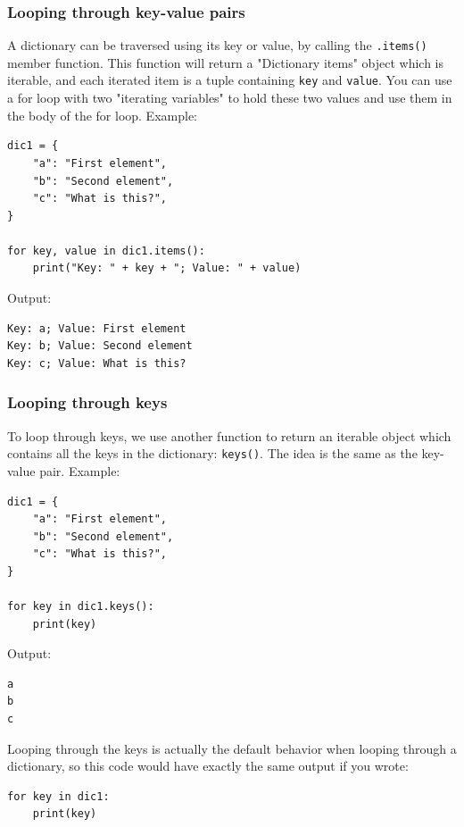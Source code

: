 \documentclass[12pt]{book}
\begin{document}
\subsubsection{Looping through key-value pairs}
\label{sec:org0eca189}
A dictionary can be traversed using its key or value, by calling the \texttt{.items()} member function. This function will return a "Dictionary items" object which is iterable, and each iterated item is a tuple containing \texttt{key} and \texttt{value}. You can use a for loop with two "iterating variables" to hold these two values and use them in the body of the for loop. Example:
\begin{verbatim}
dic1 = {
    "a": "First element",
    "b": "Second element",
    "c": "What is this?",
}

for key, value in dic1.items():
    print("Key: " + key + "; Value: " + value)
\end{verbatim}
Output:
\begin{verbatim}
Key: a; Value: First element
Key: b; Value: Second element
Key: c; Value: What is this?
\end{verbatim}
\subsubsection{Looping through keys}
\label{sec:org182b455}
To loop through keys, we use another function to return an iterable object which contains all the keys in the dictionary: \texttt{keys()}. The idea is the same as the key-value pair. Example:
\begin{verbatim}
dic1 = {
    "a": "First element",
    "b": "Second element",
    "c": "What is this?",
}

for key in dic1.keys():
    print(key)
\end{verbatim}
Output:
\begin{verbatim}
a
b
c
\end{verbatim}

Looping through the keys is actually the default behavior when looping through a dictionary, so this code would have exactly the same output if you wrote:
\begin{verbatim}
for key in dic1:
    print(key)
\end{verbatim}
\end{document}
